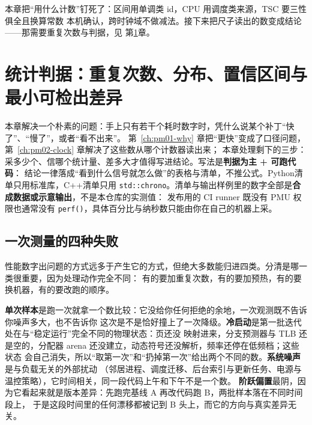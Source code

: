\documentclass[12pt,a4paper,fontset=fandol]{ctexbook}
\newcommand{\Fn}[1]{\texttt{#1()}}
\newcommand{\Tp}[1]{\texttt{#1}}
\newcommand{\Bk}{\discretionary{}{}{}}
\newcommand{\Lang}[1]{\textsf{#1}}
\newcommand{\CPP}{\Lang{C++}}
\newcommand{\PY}{\Lang{Python}}
\begin{document}
本章把``用什么计数''钉死了：区间用单调类 id，CPU 用调度类来源，TSC 要三性俱全且换算常数
本机确认，跨时钟域不做减法。接下来把尺子读出的数变成结论——那需要重复次数与判据，见
第\ref{ch:pm03-stats}章。

\chapter{统计判据：重复次数、分布、置信区间与最小可检出差异}
\label{ch:pm03-stats}

本章解决一个朴素的问题：手上只有若干个耗时数字时，凭什么说某个补丁``快了''、``慢了''，或者``看不出来''。
第~\ref{ch:pm01-why} 章把``更快''变成了口径问题，第~\ref{ch:pm02-clock} 章解决了这些数从哪个计数器读出来；
本章处理剩下的三步：采多少个、信哪个统计量、差多大才值得写进结论。写法是\textbf{判据为主 + 可跑代码}：
结论一律落成``看到什么信号就怎么做''的表格与清单，不推公式。\PY 清单只用标准库，\CPP 清单只用
\Tp{std::{\Bk}chrono}。清单与输出样例里的数字全部是\textbf{合成数据或示意输出}，不是本仓库的实测值：
发布用的 CI runner 既没有 PMU 权限也通常没有 \Fn{perf}，具体百分比与纳秒数只能由你在自己的机器上采。

\section{一次测量的四种失败}
\label{sec:pm03-failures}

性能数字出问题的方式远多于产生它的方式，但绝大多数能归进四类。分清是哪一类很重要，因为处理动作完全不同：
有的要加重复次数，有的要加预热，有的要换机器，有的要改跑的顺序。

\textbf{单次样本}是跑一次就拿一个数比较：它没给你任何拒绝的余地，一次观测既不告诉你噪声多大，也不告诉你
这次是不是恰好撞上了一次降级。\textbf{冷启动}是第一批迭代处在与``稳定运行''完全不同的物理状态：页还没
映射进来，分支预测器与 TLB 还是空的，分配器 arena 还没建立，动态符号还没解析，频率还停在低频档；这些状态
会自己消失，所以``取第一次''和``扔掉第一次''给出两个不同的数。\textbf{系统噪声}是与负载无关的外部扰动
（邻居进程、调度迁移、后台索引与更新任务、电源与温控策略），它时间相关，同一段代码上午和下午不是一个数。
\textbf{阶跃偏置}最阴，因为它看起来就是版本差异：先跑完基线 A 再改代码跑 B，两批样本落在不同时间段上，
于是这段时间里的任何漂移都被记到 B 头上，而它的方向与真实差异无关。
\end{document}
